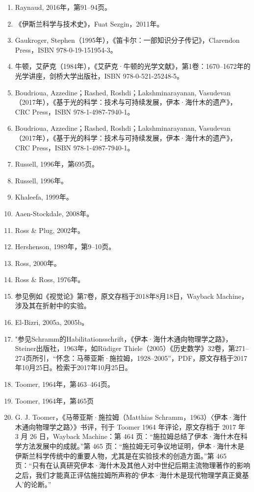 \begin{enumerate}
\item Raynaud, 2016年，第91–94页。
\item 《伊斯兰科学与技术史》，Fuat Sezgin，2011年。
\item Gaukroger, Stephen（1995年），《笛卡尔：一部知识分子传记》，Clarendon Press，ISBN 978-0-19-151954-3。
\item 牛顿，艾萨克（1984年），《艾萨克·牛顿的光学文献》，第1卷：1670–1672年的光学讲座，剑桥大学出版社，ISBN 978-0-521-25248-5。
\item Boudrioua, Azzedine；Rashed, Roshdi；Lakshminarayanan, Vasudevan（2017年），《基于光的科学：技术与可持续发展，伊本·海什木的遗产》，CRC Press，ISBN 978-1-4987-7940-1。
\item Boudrioua, Azzedine；Rashed, Roshdi；Lakshminarayanan, Vasudevan（2017年），《基于光的科学：技术与可持续发展，伊本·海什木的遗产》，CRC Press，ISBN 978-1-4987-7940-1。
\item Russell, 1996年，第695页。
\item Russell, 1996年。
\item Khaleefa, 1999年。
\item Aaen-Stockdale, 2008年。
\item Ross & Plug, 2002年。
\item Hershenson, 1989年，第9–10页。
\item Ross, 2000年。
\item Ross & Ross, 1976年。
\item 参见例如《视觉论》第7卷，原文存档于2018年8月18日，Wayback Machine，涉及其在折射中的实验。
\item El-Bizri, 2005a, 2005b。
\item "参见Schramm的Habilitationsschrift，《伊本·海什木通向物理学之路》，Steiner出版社，1963年，如Rüdiger Thiele（2005）《历史数学》32卷，第271–274页所引，“怀念：马蒂亚斯·施拉姆，1928–2005”，PDF，原文存档于2017年10月25日。检索于2017年10月25日。
\item Toomer, 1964年，第463–464页。
\item Toomer, 1964年，第465页
\item G. J. Toomer，《马蒂亚斯·施拉姆（Matthias Schramm，1963）〈伊本·海什木通向物理学之路〉》书评，刊于 Toomer 1964 年评论，原文存档于 2017 年 3 月 26 日，Wayback Machine：第 464 页：“施拉姆总结了伊本·海什木在科学方法发展中的成就。”第 465 页：“施拉姆无可争议地证明，伊本·海什木是伊斯兰科学传统中的重要人物，尤其是在实验技术的创造方面。”第 465 页：“只有在认真研究伊本·海什木及其他人对中世纪后期主流物理著作的影响之后，我们才能真正评估施拉姆所声称的‘伊本·海什木是现代物理学真正奠基人’的论断。”

\end{enumerate}
